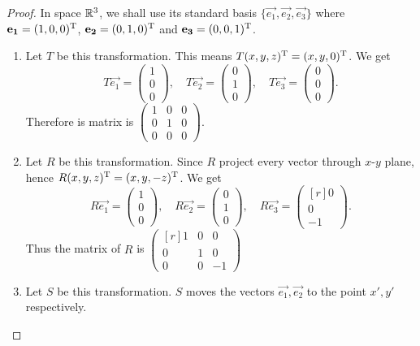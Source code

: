 \documentclass{article}
\begin{document}
\begin{proof}
  In space $\R^3$, we shall use its standard basis 
  $\{\vec{e_1},\vec{e_2},\vec{e_3}\}$ where 
  $\mathbf{e_1}=(1,0,0)^\mathrm{T}$,
  $\mathbf{e_2}=(0,1,0)^\mathrm{T}$ and 
  $\mathbf{e_3}=(0,0,1)^\mathrm{T}$.
  \begin{enumerate}
    \item Let $T$ be this transformation. This means 
      $T(x,y,z)^\mathrm{T}=(x,y,0)^\mathrm{T}$. We get
      \[
        T\vec{e_1}= \begin{pmatrix} 1\\0\\0 \end{pmatrix},\quad
        T\vec{e_2}= \begin{pmatrix} 0\\1\\0 \end{pmatrix},\quad
        T\vec{e_3}= \begin{pmatrix} 0\\0\\0 \end{pmatrix}.
      \]
      Therefore is matrix is 
      $ \begin{pmatrix} 1&0&0\\0&1&0\\0&0&0 \end{pmatrix}. $
    \item Let $R$ be this transformation. Since $R$ project every vector
      through $x$-$y$ plane, hence $R(x,y,z)^\mathrm{T}=(x,y,-z)^\mathrm{T}$. We get
      \[
        R\vec{e_1}= \begin{pmatrix} 1\\0\\0 \end{pmatrix},\quad
        R\vec{e_2}= \begin{pmatrix} 0\\1\\0 \end{pmatrix},\quad
        R\vec{e_3}= \begin{pmatrix*}[r] 0\\0\\-1 \end{pmatrix*}.
      \]
      Thus the matrix of $R$ is 
      $
      \begin{pmatrix*}[r]
        1&0&0\\
        0&1&0\\
        0&0&-1
      \end{pmatrix*}
      $
    \item Let $S$ be this transformation. $S$ moves the vectors
      $\vec{e_1},\vec{e_2}$ to the point $x',y'$ respectively.
      \begin{center}
\end{center}
\end{enumerate}
\end{proof}
\end{document}

